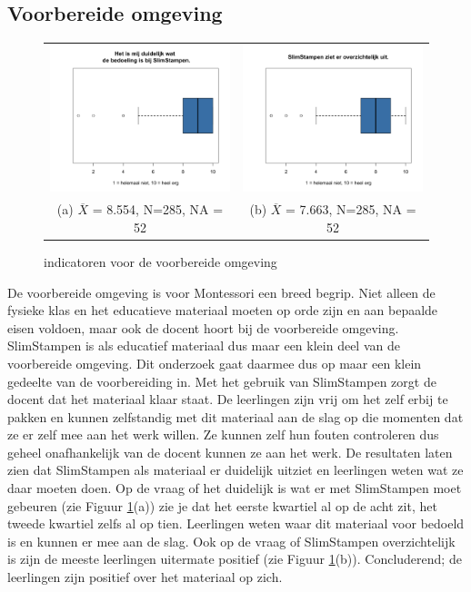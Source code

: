 \documentclass[12pt, a4paper]{article}
\begin{document}
\subsection{Voorbereide omgeving}
\begin{figure}
    \begin{tabular}{cc}
      \includegraphics[width=65mm]{12-SlimStampenIsDuidelijk.png} &   \includegraphics[width=65mm]{14-Overzichtelijk.png} \\
    (a)  $\overline{X}$ = 8.554, N=285, NA = 52 & (b) $\overline{X}$ = 7.663, N=285, NA = 52 \\[6pt]
    \end{tabular}
    \caption{indicatoren voor de voorbereide omgeving}
    \label{fig:omgeving}
    \end{figure}

De voorbereide omgeving is voor Montessori een breed begrip. Niet alleen de fysieke klas en het educatieve materiaal moeten op orde zijn en aan bepaalde eisen voldoen, maar ook de docent hoort bij de voorbereide omgeving. SlimStampen is als educatief materiaal dus maar een klein deel van de voorbereide omgeving. Dit onderzoek gaat daarmee dus op maar een klein gedeelte van de voorbereiding in. Met het gebruik van SlimStampen zorgt de docent dat het materiaal klaar staat. De leerlingen zijn vrij om het zelf erbij te pakken en kunnen zelfstandig met dit materiaal aan de slag op die momenten dat ze er zelf mee aan het werk willen. Ze kunnen zelf hun fouten controleren dus geheel onafhankelijk van de docent kunnen ze aan het werk. 
De resultaten laten zien dat SlimStampen als materiaal er duidelijk uitziet en leerlingen weten wat ze daar moeten doen. Op de vraag of het duidelijk is wat er met SlimStampen moet gebeuren (zie Figuur \ref*{fig:omgeving}(a)) zie je dat het eerste kwartiel al op de acht zit, het tweede kwartiel zelfs al op tien. Leerlingen weten waar dit materiaal voor bedoeld is en kunnen er mee aan de slag. Ook op de vraag of SlimStampen overzichtelijk is zijn de meeste leerlingen uitermate positief (zie Figuur \ref*{fig:omgeving}(b)). Concluderend; de leerlingen zijn positief over het materiaal op zich.
\end{document}
